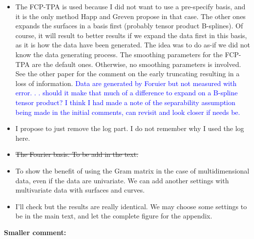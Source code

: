 \documentclass[11pt]{article}
\begin{document}
\begin{itemize}
  \item The FCP-TPA is used because I did not want to use a pre-specify basis, and it is the only method Happ and Greven propose in that case. The other ones expands the surfaces in a basis first (probably tensor product B-splines). Of course, it will result to better results if we expand the data first in this basis, as it is how the data have been generated. The idea was to do as-if we did not know the data generating process.
  The smoothing parameters for the FCP-TPA are the default ones. Otherwise, no smoothing parameters is involved. See the other paper for the comment on the early truncating resulting in a loss of information. \textcolor{blue}{Data are generated by Foruier but not measured with error. . . should it make that much of a difference to expand on a B-spline tensor product? I think I had made a note of the separability assumption being made in the initial comments, can revisit and look closer if needs be.}
  \item I propose to just remove the log part. I do not remember why I used the log here.
  \item \sout{The Fourier basis. To be add in the text.}
  \item To show the benefit of using the Gram matrix in the case of multidimensional data, even if the data are univariate. We can add another settings with multivariate data with surfaces and curves.
  \item I'll check but the results are really identical. We may choose some settings to be in the main text, and let the complete figure for the appendix. 
\end{itemize}


\bigskip


\itshape


\textbf{Smaller comment:}
\end{document}
